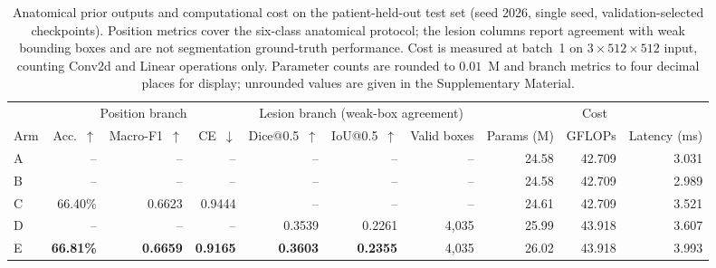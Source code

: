 \begin{table}[!t]
\centering
\caption{Anatomical prior outputs and computational cost on the
patient-held-out test set (seed 2026, single seed, validation-selected
checkpoints). Position metrics cover the six-class anatomical protocol; the
lesion columns report agreement with weak bounding boxes and are not
segmentation ground-truth performance. Cost is measured at batch~1 on
$3\times512\times512$ input, counting Conv2d and Linear operations only.
Parameter counts are rounded to $0.01$~M and branch metrics to four decimal
places for display; unrounded values are given in the Supplementary Material.}
\label{tab:auxiliary}
\small
\begin{tabular}{@{}l rrr rrr rrr@{}}
\toprule
 & \multicolumn{3}{c}{Position branch} & \multicolumn{3}{c}{Lesion branch (weak-box agreement)} & \multicolumn{3}{c}{Cost} \\
\cmidrule(lr){2-4} \cmidrule(lr){5-7} \cmidrule(lr){8-10}
Arm & Acc.~$\uparrow$ & Macro-F1~$\uparrow$ & CE~$\downarrow$ & Dice@0.5~$\uparrow$ & IoU@0.5~$\uparrow$ & Valid boxes & Params (M) & GFLOPs & Latency (ms) \\
\midrule
A & --      & --     & --     & --     & --     & --    & 24.58 & 42.709 & 3.031 \\
B & --      & --     & --     & --     & --     & --    & 24.58 & 42.709 & 2.989 \\
C & 66.40\% & 0.6623 & 0.9444 & --     & --     & --    & 24.61 & 42.709 & 3.521 \\
D & --      & --     & --     & 0.3539 & 0.2261 & 4,035 & 25.99 & 43.918 & 3.607 \\
E & \textbf{66.81\%} & \textbf{0.6659} & \textbf{0.9165} & \textbf{0.3603} & \textbf{0.2355} & 4,035 & 26.02 & 43.918 & 3.993 \\
\bottomrule
\end{tabular}
\end{table}
